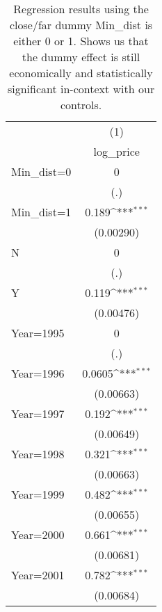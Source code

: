 {
\def\sym#1{\ifmmode^{#1}\else\(^{#1}\)\fi}
\begin{longtable}{l*{1}{c}}
\caption{Regression results using the close/far dummy Min\_dist is either 0 or 1. Shows us that the dummy effect is still economically and statistically significant in-context with our controls.}\\
\toprule\endfirsthead\midrule\endhead\midrule\endfoot\endlastfoot
                    &\multicolumn{1}{c}{(1)}\\
                    &\multicolumn{1}{c}{log\_price}\\
\midrule
Min\_dist=0          &           0         \\
                    &         (.)         \\
\addlinespace
Min\_dist=1          &       0.189\sym{***}\\
                    &   (0.00290)         \\
\addlinespace
N                   &           0         \\
                    &         (.)         \\
\addlinespace
Y                   &       0.119\sym{***}\\
                    &   (0.00476)         \\
\addlinespace
Year=1995           &           0         \\
                    &         (.)         \\
\addlinespace
Year=1996           &      0.0605\sym{***}\\
                    &   (0.00663)         \\
\addlinespace
Year=1997           &       0.192\sym{***}\\
                    &   (0.00649)         \\
\addlinespace
Year=1998           &       0.321\sym{***}\\
                    &   (0.00663)         \\
\addlinespace
Year=1999           &       0.482\sym{***}\\
                    &   (0.00655)         \\
\addlinespace
Year=2000           &       0.661\sym{***}\\
                    &   (0.00681)         \\
\addlinespace
Year=2001           &       0.782\sym{***}\\
                    &   (0.00684)         \\

\end{longtable}}
